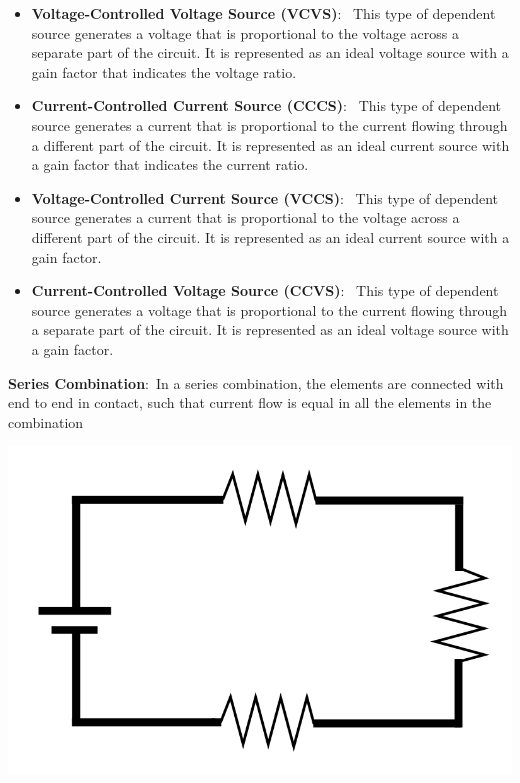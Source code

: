 \documentclass[nobib]{tufte-handout}
\newcommand{\defn}[2]{\noindent\textbf{#1}:\ #2}
\begin{document}
\begin{itemize}
    \item \defn{Voltage-Controlled Voltage Source (VCVS)}{
    This type of dependent source generates a voltage 
    that is proportional to the voltage across a 
    separate part of the circuit. It is represented 
    as an ideal voltage source with a gain factor 
    that indicates the voltage ratio.}

    \item \defn{Current-Controlled Current Source (CCCS)}{
    This type of dependent source generates a current 
    that is proportional to the current flowing 
    through a different part of the circuit. It 
    is represented as an ideal current source with 
    a gain factor that indicates the current ratio.}

    \item \defn{Voltage-Controlled Current Source (VCCS)}{
    This type of dependent source generates a 
    current that is proportional to the 
    voltage across a different part of the 
    circuit. It is represented as an ideal 
    current source with a gain factor.}

    \item \defn{Current-Controlled Voltage Source (CCVS)}{
    This type of dependent source generates a 
    voltage that is proportional to the 
    current flowing through a separate part 
    of the circuit. It is represented as an 
    ideal voltage source with a gain factor.}
\end{itemize}

\defn{Series Combination}{In a series combination, the elements 
are connected with end to end in contact, such that 
current flow is equal in all the elements in the 
combination}

\includegraphics[width=\textwidth/2]{images/Series_circuit.svg.png}
\end{document}
